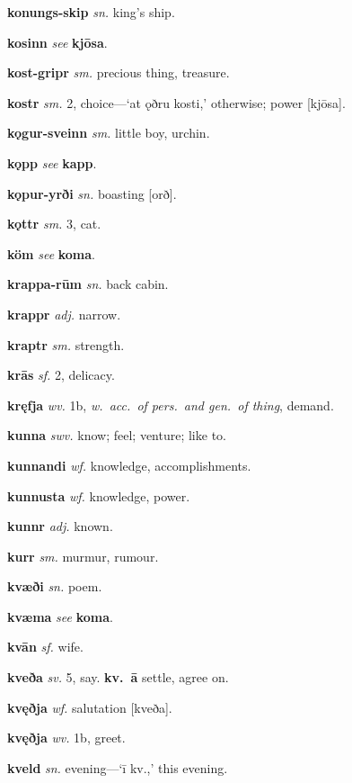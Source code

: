 \documentclass[12pt,letterpaper]{book}
\begin{document}
\noindent
\textbf{konungs-skip} \textit{sn.} king's ship.

\noindent
\textbf{kosinn} \textit{} \textit{see} \textbf{kjōsa}.

\noindent
\textbf{kost-gripr} \textit{sm.} precious thing, treasure.

\noindent
\textbf{kostr} \textit{sm.} 2, choice---`at ǫðru kosti,' otherwise;
	power [kjōsa].

\noindent
\textbf{kǫgur-sveinn} \textit{sm.} little boy, urchin.

\noindent
\textbf{kǫpp} \textit{} \textit{see} \textbf{kapp}.

\noindent
\textbf{kǫpur-yrði} \textit{sn.} boasting [orð].

\noindent
\textbf{kǫttr} \textit{sm.} 3, cat.

\noindent
\textbf{köm} \textit{} \textit{see} \textbf{koma}.

\noindent
\textbf{krappa-rūm} \textit{sn.} back cabin.

\noindent
\textbf{krappr} \textit{adj.} narrow.

\noindent
\textbf{kraptr} \textit{sm.} strength.

\noindent
\textbf{krās} \textit{sf.} 2, delicacy.

\noindent
\textbf{kręfja} \textit{wv.} 1b, \textit{w.\ acc.\ of pers.\ and gen.\ of
	thing}, demand.

\noindent
\textbf{kunna} \textit{swv.} know; feel; venture; like to.

\noindent
\textbf{kunnandi} \textit{wf.} knowledge, accomplishments.

\noindent
\textbf{kunnusta} \textit{wf.} knowledge, power.

\noindent
\textbf{kunnr} \textit{adj.} known.

\noindent
\textbf{kurr} \textit{sm.} murmur, rumour.

\noindent
\textbf{kvæði} \textit{sn.} poem.

\noindent
\textbf{kvæma} \textit{} \textit{see} \textbf{koma}.

\noindent
\textbf{kvān} \textit{sf.} wife.

\noindent
\textbf{kveða} \textit{sv.} 5, say.  \textbf{kv.\ ā} settle, agree on.

\noindent
\textbf{kvęðja} \textit{wf.} salutation [kveða].

\noindent
\textbf{kvęðja} \textit{wv.} 1b, greet.

\noindent
\textbf{kveld} \textit{sn.} evening---`ī kv.,' this evening.
\end{document}

